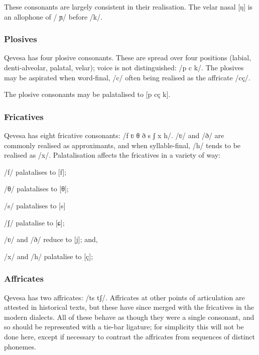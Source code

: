 \documentclass[grammar]{subfiles}
\begin{document}
  These consonants are largely consistent in their realisation. 
  The velar nasal [ŋ] is an allophone of / ɲ/ before /k/.

  \subsubsection{Plosives}
  \label{sssec:plosives}

  Qevesa has four plosive consonants.  These are spread over four positions (labial, denti-alveolar, palatal, velar); voice is not distinguished: /p  c k/.  The plosives may be aspirated when word-final, /c/ often being realised as the affricate /cç/.
  
  The plosive consonants may be palatalised to [p\superj{}  cç k\superj].

  \subsubsection{Fricatives}
  \label{sssec:fricatives}

  Qevesa has eight fricative consonants: /f ʋ θ ð s ʃ x h/.  /ʋ/ and /ð/ are commonly realised as approximants, and when syllable-final, /h/ tends to be realised as /x/. 
  Palatalisation affects the fricatives in a variety of way: 
 
  \begin{itemize*}
    \item /f/ palatalises to [f\superj];
    \item /θ/ palatalises to [θ\superj];
    \item /s/ palatalises to [s\superj]
    \item /ʃ/ palatalise to [ɕ];
    \item /ʋ/ and /ð/ reduce to [j]; and,
    \item /x/ and /h/ palatalise to [ç];
  \end{itemize*}

  \subsubsection{Affricates}
  \label{sssec:affricates}

  Qevesa has two affricates: /ts tʃ/.  Affricates at other points of articulation are attested in historical texts, but these have since merged with the fricatives in the modern dialects.  All of these behave as though they were a single consonant, and so should be represented with a tie-bar ligature; for simplicity this will not be done here, except if necessary to contrast the affricates from sequences of distinct phonemes. 
\end{document}
